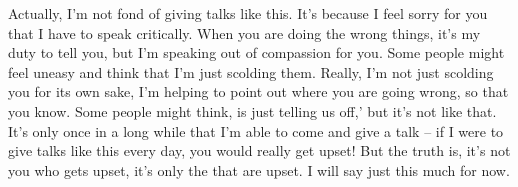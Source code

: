 Actually, I'm not fond of giving talks like this. It's because I feel sorry for you that I have to speak critically. When you are doing the wrong things, it's my duty to tell you, but I'm speaking out of compassion for you. Some people might feel uneasy and think that I'm just scolding them. Really, I'm not just scolding you for its own sake, I'm helping to point out where you are going wrong, so that you know. Some people might think,  is just telling us off,' but it's not like that. It's only once in a long while that I'm able to come and give a talk -- if I were to give talks like this every day, you would really get upset! But the truth is, it's not you who gets upset, it's only the  that are upset. I will say just this much for now.
